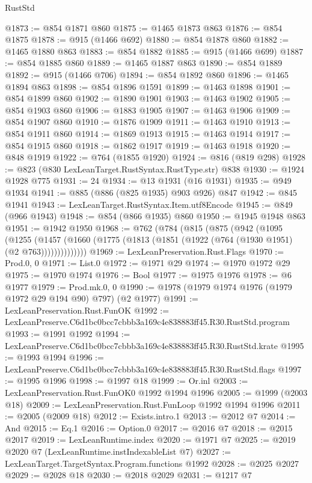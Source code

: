 \begin{lexlean}{RustStd}
\begin{coremodule}
@1873 := @854 @1871 @860
@1875 := @1465 @1873 @863
@1876 := @854 @1875
@1878 := @915 (@1466 @692)
@1880 := @854 @1878 @860
@1882 := @1465 @1880 @863
@1883 := @854 @1882
@1885 := @915 (@1466 @699)
@1887 := @854 @1885 @860
@1889 := @1465 @1887 @863
@1890 := @854 @1889
@1892 := @915 (@1466 @706)
@1894 := @854 @1892 @860
@1896 := @1465 @1894 @863
@1898 := @854 @1896 @1591
@1899 := @1463 @1898
@1901 := @854 @1899 @860
@1902 := @1890 @1901
@1903 := @1463 @1902
@1905 := @854 @1903 @860
@1906 := @1883 @1905
@1907 := @1463 @1906
@1909 := @854 @1907 @860
@1910 := @1876 @1909
@1911 := @1463 @1910
@1913 := @854 @1911 @860
@1914 := @1869 @1913
@1915 := @1463 @1914
@1917 := @854 @1915 @860
@1918 := @1862 @1917
@1919 := @1463 @1918
@1920 := @848 @1919
@1922 := @764 (@1855 @1920)
@1924 := @816 (@819 @298)
@1928 := @823 (@830 LexLeanTarget.RustSyntax.RustType.str) @838
@1930 := @1924 @1928 @775
@1931 := 24
@1934 := @13 @1931 (@16 @1931)
@1935 := @949 @1934
@1941 := @885 (@886 (@825 @1935) @903 @926) @847
@1942 := @845 @1941
@1943 := LexLeanTarget.RustSyntax.Item.utf8Encode
@1945 := @849 (@966 @1943)
@1948 := @854 (@866 @1935) @860
@1950 := @1945 @1948 @863
@1951 := @1942 @1950
@1968 := @762
    (@784
      (@815
        (@875
          (@942
            (@1095
              (@1255
                (@1457 (@1660 (@1775 (@1813 (@1851 (@1922 (@764 (@1930 @1951) (@2 @763))))))))))))))
@1969 := LexLeanPreservation.Rust.Flags
@1970 := Prod.{0, 0}
@1971 := List.{0}
@1972 := @1971 @29
@1974 := @1970 @1972 @29
@1975 := @1970 @1974
@1976 := Bool
@1977 := @1975 @1976
@1978 := @6 @1977
@1979 := Prod.mk.{0, 0}
@1990 := @1978 (@1979 @1974 @1976 (@1979 @1972 @29 @194 @90) @797) (@2 @1977)
@1991 := LexLeanPreservation.Rust.FunOK
@1992 := LexLeanPreserve.C6d1bc0bcc7cbbb3a169c4e838883ff45.R30.RustStd.program
@1993 := @1991 @1992
@1994 := LexLeanPreserve.C6d1bc0bcc7cbbb3a169c4e838883ff45.R30.RustStd.krate
@1995 := @1993 @1994
@1996 := LexLeanPreserve.C6d1bc0bcc7cbbb3a169c4e838883ff45.R30.RustStd.flags
@1997 := @1995 @1996
@1998 := @1997 @18
@1999 := Or.inl
@2003 := LexLeanPreservation.Rust.FunOK0 @1992 @1994 @1996
@2005 := @1999 (@2003 @18)
@2009 := LexLeanPreservation.Rust.FunLoop @1992 @1994 @1996
@2011 := @2005 (@2009 @18)
@2012 := Exists.intro.{1}
@2013 := @2012 @7
@2014 := And
@2015 := Eq.{1}
@2016 := Option.{0}
@2017 := @2016 @7
@2018 := @2015 @2017
@2019 := LexLeanRuntime.index
@2020 := @1971 @7
@2025 := @2019 @2020 @7 (LexLeanRuntime.instIndexableList @7)
@2027 := LexLeanTarget.TargetSyntax.Program.functions @1992
@2028 := @2025 @2027
@2029 := @2028 @18
@2030 := @2018 @2029
@2031 := @1217 @7

\end{coremodule}
\end{lexlean}
